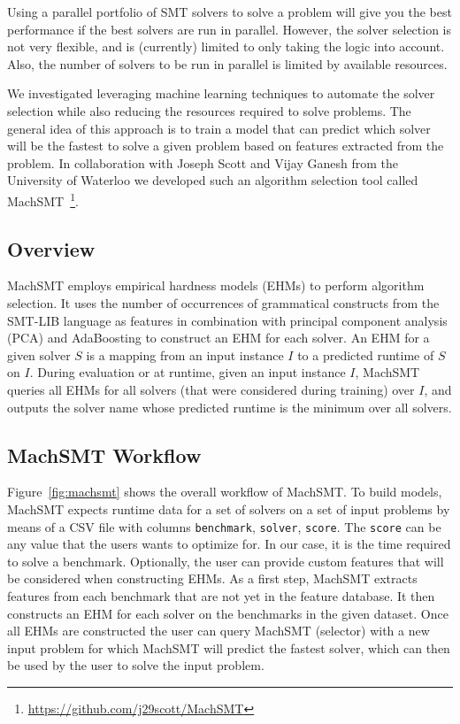 \documentclass{article}
\begin{document}
Using a parallel portfolio of SMT solvers to solve a problem will give you
the best performance if the best solvers are run in parallel. However, the
solver selection is not very flexible,
and is (currently) limited to only taking the logic into account.
Also, the number of solvers to
be run in parallel is limited by available resources.

We investigated leveraging machine learning techniques to automate the
solver selection while also reducing the resources required to solve problems.
The general idea of this approach is to train a model that can predict which
solver will be the fastest to solve a given problem based on features extracted
from the problem.
In collaboration with Joseph Scott and Vijay Ganesh from the University of
Waterloo we developed such an algorithm selection tool called
MachSMT~\footnote{\url{https://github.com/j29scott/MachSMT}}.

\subsection{Overview}

MachSMT employs empirical hardness models (EHMs) to perform algorithm
selection.
It uses the number of occurrences of grammatical constructs from the
SMT-LIB language as features in combination with principal component analysis
(PCA) and AdaBoosting to construct an EHM for each solver.
An EHM for a given solver $S$ is a mapping from an input instance $I$ to a
predicted runtime of $S$ on $I$.
During evaluation or at runtime, given an input instance $I$, MachSMT queries
all EHMs for all solvers (that were considered during training) over $I$, and
outputs the solver name whose predicted runtime is the minimum over all
solvers.

\subsection{MachSMT Workflow}

Figure~\ref{fig:machsmt} shows the overall workflow of MachSMT.
To build models, MachSMT expects runtime data for a set of solvers on a set of
input problems by means of a CSV file with columns \texttt{benchmark},
\texttt{solver}, \texttt{score}.
The \texttt{score} can be any value that the users wants to optimize for.
In our case, it is the time required to solve a benchmark.
Optionally, the user can provide custom features that will be considered when
constructing EHMs.
As a first step, MachSMT extracts features from each benchmark that are not yet
in the feature database.
It then constructs an EHM for each solver on the benchmarks in the given
dataset.
Once all EHMs are constructed the user can query MachSMT (selector) with a new
input problem for which MachSMT will predict the fastest solver, which can then
be used by the user to solve the input problem.
\end{document}
